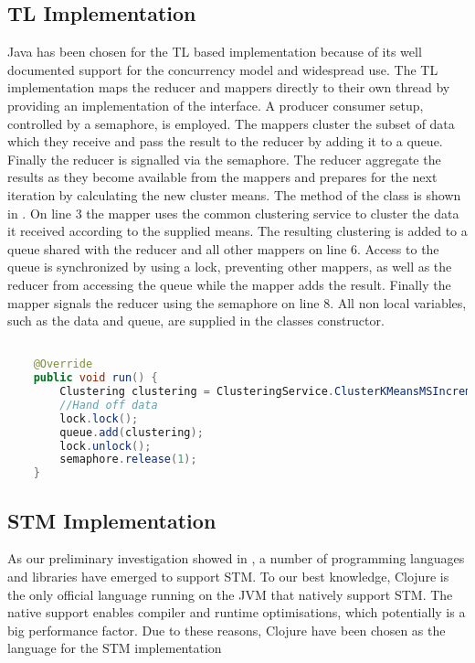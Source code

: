 \subsection{\ac{TL} Implementation}
Java has been chosen for the \ac{TL} based implementation because of its well documented support for the concurrency model and widespread use. The \ac{TL} implementation maps the reducer and mappers directly to their own thread by providing an implementation of the  interface. A producer consumer setup, controlled by a semaphore, is employed. The mappers cluster the subset of data which they receive and pass the result to the reducer by adding it to a queue. Finally the reducer is signalled via the semaphore. The reducer aggregate the results as they become available from the mappers  and prepares for the next iteration by calculating the new cluster means. The  method of the  class is shown in . On line 3 the mapper uses the common clustering service to cluster the data it received according to the supplied means. The resulting clustering is added to a queue shared with the reducer and all other mappers on line 6. Access to the queue is synchronized by using a lock, preventing other mappers, as well as the reducer from accessing the queue while the mapper adds the result. Finally the mapper signals the reducer using the semaphore on line 8. All non local variables, such as the data and queue, are supplied in the  classes constructor.

\begin{lstlisting}[float,label=lst:tl_implementation,
  caption={\ac{TL} Implementation},
  language=Java,  
  showspaces=false,
  showtabs=false,
  breaklines=true,
  showstringspaces=false,
  breakatwhitespace=true,
  commentstyle=\color{greencomments},
  keywordstyle=\color{bluekeywords},
  stringstyle=\color{redstrings}]  % Start your code-block

    @Override
    public void run() {
        Clustering clustering = ClusteringService.ClusterKMeansMSIncremental(data, means);
        //Hand off data
        lock.lock();
        queue.add(clustering);
        lock.unlock();
        semaphore.release(1);
    }  
\end{lstlisting}

\subsection{\ac{STM} Implementation}
As our preliminary investigation showed in , a number of programming languages and libraries have emerged to support \ac{STM}. To our best knowledge, Clojure is the only official language running on the \ac{JVM} that natively support \ac{STM}. The native support enables compiler and runtime optimisations, which potentially is a big performance factor. Due to these reasons, Clojure have been chosen as the language for the \ac{STM} implementation

